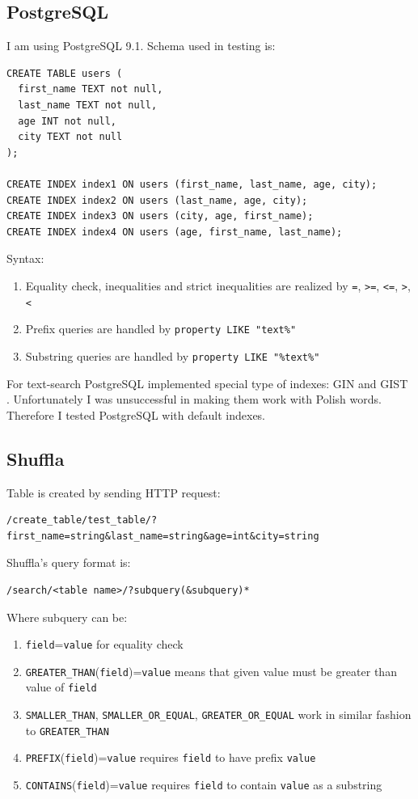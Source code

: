 \documentclass[10pt,a4paper]{article}
\begin{document}
\subsection{PostgreSQL}

I am using PostgreSQL 9.1. Schema used in testing is:

\begin{verbatim}
CREATE TABLE users (
  first_name TEXT not null,
  last_name TEXT not null,
  age INT not null,
  city TEXT not null
);

CREATE INDEX index1 ON users (first_name, last_name, age, city);
CREATE INDEX index2 ON users (last_name, age, city);
CREATE INDEX index3 ON users (city, age, first_name);
CREATE INDEX index4 ON users (age, first_name, last_name);
\end{verbatim}

Syntax:
\begin{enumerate}
\item Equality check, inequalities and strict inequalities are realized by \verb|=|, \verb|>=|, \verb|<=|, \verb|>|, \verb|<|
\item Prefix queries are handled by \verb|property LIKE "text%"|
\item Substring queries are handled by \verb|property LIKE "%text%"|
\end{enumerate}

For text-search PostgreSQL implemented special type of indexes: GIN \cite{PSQLGIN} and GIST \cite{PSQLGIST}. Unfortunately I was unsuccessful in making them work with Polish words. Therefore I tested PostgreSQL with default indexes.

\subsection{Shuffla}

Table is created by sending HTTP request:
\begin{verbatim}
/create_table/test_table/?first_name=string&last_name=string&age=int&city=string
\end{verbatim}
Shuffla's query format is:

\begin{verbatim}
/search/<table name>/?subquery(&subquery)*
\end{verbatim}
Where subquery can be:
\begin{enumerate}
\item \verb|field|=\verb|value| for equality check
\item \verb|GREATER_THAN|(\verb|field|)=\verb|value| means that given value must be greater than value of \verb|field| 
\item \verb|SMALLER_THAN|, \verb|SMALLER_OR_EQUAL|, \verb|GREATER_OR_EQUAL| work in similar fashion to \verb|GREATER_THAN|
\item \verb|PREFIX|(\verb|field|)=\verb|value| requires \verb|field| to have prefix \verb|value|
\item \verb|CONTAINS|(\verb|field|)=\verb|value| requires \verb|field| to contain \verb|value| as a substring
\end{enumerate}
\end{document}
